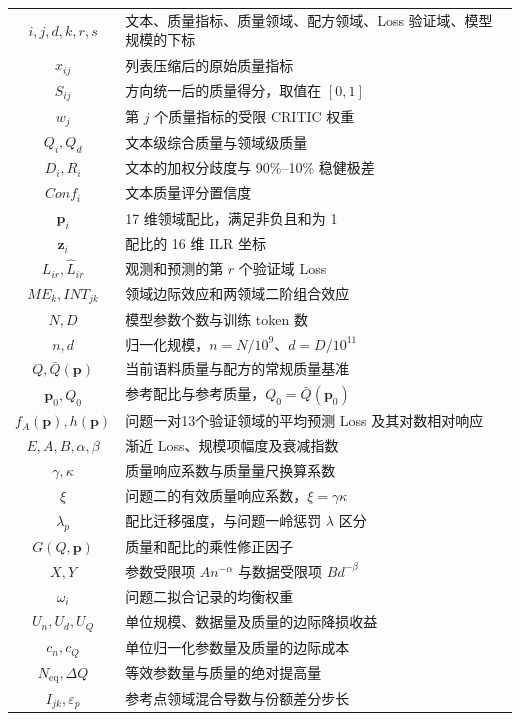 \documentclass[bwprint]{gmcmthesis}
\numberwithin{equation}{section}
\numberwithin{figure}{section}
\numberwithin{table}{section}
\begin{document}
\begin{xltabular}{0.92\textwidth}{cX}
    $i,j,d,k,r,s$ & 文本、质量指标、质量领域、配方领域、Loss 验证域、模型规模的下标 \\
    $x_{ij}$ & 列表压缩后的原始质量指标 \\
    $S_{ij}$ & 方向统一后的质量得分，取值在 $[0,1]$ \\
    $w_j$ & 第 $j$ 个质量指标的受限 CRITIC 权重 \\
    $Q_i,Q_d$ & 文本级综合质量与领域级质量 \\
    $D_i,R_i$ & 文本的加权分歧度与 90\%--10\% 稳健极差 \\
    $Conf_i$ & 文本质量评分置信度 \\
    $\bm p_i$ & 17 维领域配比，满足非负且和为 1 \\
    $\bm z_i$ & 配比的 16 维 ILR 坐标 \\
    $L_{ir},\widehat L_{ir}$ & 观测和预测的第 $r$ 个验证域 Loss \\
    $ME_k,INT_{jk}$ & 领域边际效应和两领域二阶组合效应 \\
    $N,D$ & 模型参数个数与训练 token 数 \\
    $n,d$ & 归一化规模，$n=N/10^9$、$d=D/10^{11}$ \\
    $Q,\bar Q(\bm p)$ & 当前语料质量与配方的常规质量基准 \\
    $\bm p_0,Q_0$ & 参考配比与参考质量，$Q_0=\bar Q(\bm p_0)$ \\
    $f_A(\bm p),h(\bm p)$ & 问题一对13个验证领域的平均预测 Loss 及其对数相对响应 \\
    $E,A,B,\alpha,\beta$ & 渐近 Loss、规模项幅度及衰减指数 \\
    $\gamma,\kappa$ & 质量响应系数与质量量尺换算系数 \\
    $\xi$ & 问题二的有效质量响应系数，$\xi=\gamma\kappa$ \\
    $\lambda_p$ & 配比迁移强度，与问题一岭惩罚 $\lambda$ 区分 \\
    $G(Q,\bm p)$ & 质量和配比的乘性修正因子 \\
    $X,Y$ & 参数受限项 $An^{-\alpha}$ 与数据受限项 $Bd^{-\beta}$ \\
    $\omega_i$ & 问题二拟合记录的均衡权重 \\
    $U_n,U_d,U_Q$ & 单位规模、数据量及质量的边际降损收益 \\
    $c_n,c_Q$ & 单位归一化参数量及质量的边际成本 \\
    $N_{\mathrm{eq}},\Delta Q$ & 等效参数量与质量的绝对提高量 \\
    $I_{jk},\varepsilon_p$ & 参考点领域混合导数与份额差分步长 \\

\end{xltabular}
\end{document}
